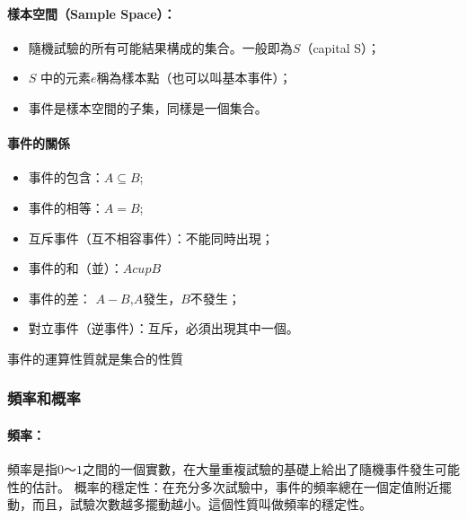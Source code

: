\documentclass[11pt]{article}
\providecommand{\tightlist}{%
      \setlength{\itemsep}{0pt}\setlength{\parskip}{0pt}}
\begin{document}
    \hypertarget{ux6a23ux672cux7a7aux9593sample-space}{%
\paragraph{樣本空間（Sample
Space）：}\label{ux6a23ux672cux7a7aux9593sample-space}}

\begin{itemize}
\tightlist
\item
  隨機試驗的所有可能結果構成的集合。一般即為\(S\)（capital S）；
\item
  \(S\) 中的元素\(e\)稱為樣本點（也可以叫基本事件）；
\item
  事件是樣本空間的子集，同樣是一個集合。
\end{itemize}

    \hypertarget{ux4e8bux4ef6ux7684ux95dcux4fc2}{%
\paragraph{事件的關係}\label{ux4e8bux4ef6ux7684ux95dcux4fc2}}

\begin{itemize}
\tightlist
\item
  事件的包含：\(A \subseteq B\);
\item
  事件的相等：\(A = B\);
\item
  互斥事件（互不相容事件）：不能同時出現；
\item
  事件的和（並）：\(A cup B\)
\item
  事件的差： \(A - B\),\(A\)發生，\(B\)不發生；
\item
  對立事件（逆事件）：互斥，必須出現其中一個。
\end{itemize}

 事件的運算性質就是集合的性質

    \hypertarget{ux983bux7387ux548cux6982ux7387}{%
\subsubsection{頻率和概率}\label{ux983bux7387ux548cux6982ux7387}}

\hypertarget{ux983bux7387}{%
\paragraph{頻率：}\label{ux983bux7387}}

頻率是指\(0～1\)之間的一個實數，在大量重複試驗的基礎上給出了隨機事件發生可能性的估計。
概率的穩定性：在充分多次試驗中，事件的頻率總在一個定值附近擺動，而且，試驗次數越多擺動越小。這個性質叫做頻率的穩定性。
\end{document}
